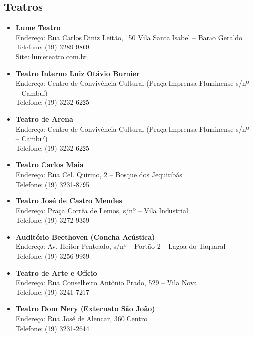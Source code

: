 \subsection{Teatros}

\begin{itemize}
\item   \textbf{Lume Teatro}
		\\Endereço:  Rua Carlos Diniz Leitão, 150 Vila Santa Isabel -- Barão Geraldo
		\\Telefone: (19) 3289-9869
		\\Site: \url{lumeteatro.com.br}

\item   \textbf{Teatro Interno Luiz Otávio Burnier}
		\\Endereço: Centro de Convivência Cultural (Praça Imprensa Fluminense s/nº -- Cambuí)
		\\Telefone: (19) 3232-6225

\item   \textbf{Teatro de Arena}
		\\Endereço: Centro de Convivência Cultural (Praça Imprensa Fluminense s/nº -- Cambuí)
		\\Telefone: (19) 3232-6225

\item   \textbf{Teatro Carlos Maia}
		\\Endereço: Rua Cel. Quirino, 2 -- Bosque dos Jequitibás
		\\Telefone: (19) 3231-8795

\item   \textbf{Teatro José de Castro Mendes}
		\\Endereço: Praça Corrêa de Lemos, s/nº -- Vila Industrial
		\\Telefone: (19) 3272-9359

\item   \textbf{Auditório Beethoven (Concha Acústica)}
		\\Endereço: Av. Heitor Penteado, s/nº -- Portão 2 -- Lagoa do Taquaral
		\\Telefone: (19) 3256-9959

\item   \textbf{Teatro de Arte e Ofício}
		\\Endereço: Rua Conselheiro Antônio Prado, 529 -- Vila Nova
		\\Telefone: (19) 3241-7217

\item   \textbf{Teatro Dom Nery (Externato São João)}
		\\Endereço: Rua José de Alencar, 360  Centro
		\\Telefone: (19) 3231-2644


\end{itemize}
